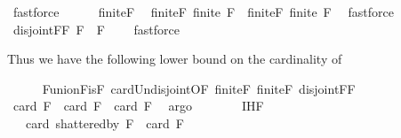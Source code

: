 \begin{isabellebody}
\ fastforce\isanewline
\ \ \ \ \isamarkupfalse%
\ finite{\isacharunderscore}{\kern0pt}F\ \isamarkupfalse%
\ finite{\isacharunderscore}{\kern0pt}F{}{\isacharcolon}{\kern0pt}\ {\isachardoublequoteopen}finite\ {\isacharquery}{\kern0pt}F{}{\isachardoublequoteclose}\ \ finite{\isacharunderscore}{\kern0pt}F{}{\isacharcolon}{\kern0pt}\ {\isachardoublequoteopen}finite\ {\isacharquery}{\kern0pt}F{}{\isachardoublequoteclose}\ \isamarkupfalse%
\ fastforce{\isacharplus}{\kern0pt}\isanewline
\ \ \ \ \isamarkupfalse%
\ disjoint{\isacharunderscore}{\kern0pt}F{}{\isacharunderscore}{\kern0pt}F{}{\isacharcolon}{\kern0pt}\ {\isachardoublequoteopen}{\isacharquery}{\kern0pt}F{}\ {\isasyminter}\ {\isacharquery}{\kern0pt}F{}\ {\isacharequal}{\kern0pt}\ {\isacharbraceleft}{\kern0pt}{\isacharbraceright}{\kern0pt}{\isachardoublequoteclose}\ \isamarkupfalse%
\ fastforce%
\begin{isamarkuptext}%
Thus we have the following lower bound on the cardinality of %
\end{isamarkuptext}\isamarkuptrue%
\ \ \ \ \isamarkupfalse%
\ F{}{\isacharunderscore}{\kern0pt}union{\isacharunderscore}{\kern0pt}F{}{\isacharunderscore}{\kern0pt}is{\isacharunderscore}{\kern0pt}F\ card{\isacharunderscore}{\kern0pt}Un{\isacharunderscore}{\kern0pt}disjoint{\isacharbrackleft}{\kern0pt}OF\ finite{\isacharunderscore}{\kern0pt}F{}\ finite{\isacharunderscore}{\kern0pt}F{}\ disjoint{\isacharunderscore}{\kern0pt}F{}{\isacharunderscore}{\kern0pt}F{}{\isacharbrackright}{\kern0pt}\ \isanewline
\ \ \ \ \isamarkupfalse%
\ {\isachardoublequoteopen}card\ F\ {\isacharequal}{\kern0pt}\ card\ {\isacharquery}{\kern0pt}F{}\ {\isacharplus}{\kern0pt}\ card\ {\isacharquery}{\kern0pt}F{}{\isachardoublequoteclose}\ \isamarkupfalse%
\ argo\isanewline
\ \ \ \ \isamarkupfalse%
\ \isamarkupfalse%
\ IH{\isacharunderscore}{\kern0pt}F{}\isanewline
\ \ \ \ \isamarkupfalse%
\ {\isachardoublequoteopen}{\isachardot}{\kern0pt}{\isachardot}{\kern0pt}{\isachardot}{\kern0pt}\ {\isasymle}\ card\ {\isacharparenleft}{\kern0pt}shattered{\isacharunderscore}{\kern0pt}by\ {\isacharquery}{\kern0pt}F{}{\isacharparenright}{\kern0pt}\ {\isacharplus}{\kern0pt}\ card\ {\isacharquery}{\kern0pt}F{}{\isachardoublequoteclose}\ \isamarkupfalse%

\end{isabellebody}
